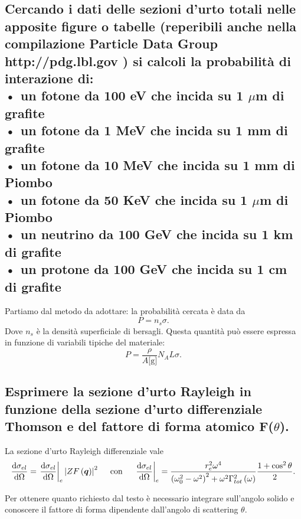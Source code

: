 \subsection[\hspace{1mm} ]{Cercando i dati delle sezioni d’urto totali nelle apposite figure o tabelle (reperibili anche nella compilazione Particle Data Group http://pdg.lbl.gov ) si calcoli la probabilità di interazione di:\\
• un fotone da 100 eV che incida su 1 $\mu$m di grafite\\
• un fotone da 1 MeV che incida su 1 mm di grafite\\
• un fotone da 10 MeV che incida su 1 mm di Piombo\\
• un fotone da 50 KeV che incida su 1 $\mu$m di Piombo\\
• un neutrino da 100 GeV che incida su 1 km di grafite\\
• un protone da 100 GeV che incida su 1 cm di grafite\\
}
\label{sec:4.b.23}
Partiamo dal metodo da adottare: la probabilità cercata è data da
\[
	P = n_{s}\sigma
.\] Dove $n_{s}$ è la densità superficiale di bersagli. Questa quantità può essere espressa in funzione di variabili tipiche del materiale:
\[
	P = \frac{\rho}{A \text{[g]}}N_{A}L\sigma
.\] 
\subsection[\hspace{1mm} ]{Esprimere la sezione d'urto Rayleigh in funzione della sezione d'urto differenziale Thomson e del fattore di forma atomico F($\theta$).
}
\label{sec:4.b.24}
La sezione d'urto Rayleigh differenziale vale
\[
	\frac{\mbox{d} \sigma_{el}}{\mbox{d} \Omega}= \left.\frac{\mbox{d} \sigma_{el}}{\mbox{d} \Omega} \right|_{e} \left| Z F\left( \boldsymbol{q} \right)  \right|^2 \quad
		\text{ con }
	\quad
	\left.\frac{\mbox{d} \sigma_{el }}{\mbox{d} \Omega} \right|_{e}= 
		\frac{r_e^2\omega^4}{\left( \omega_0^2-\omega^2 \right)^2 + \omega^2\Gamma_{tot}^2\left( \omega \right)} \frac{1+\cos^2\theta}{2}
.\] 

Per ottenere quanto richiesto dal testo è necessario integrare sull'angolo solido e conoscere il fattore di forma dipendente dall'angolo di scattering $\theta$.

